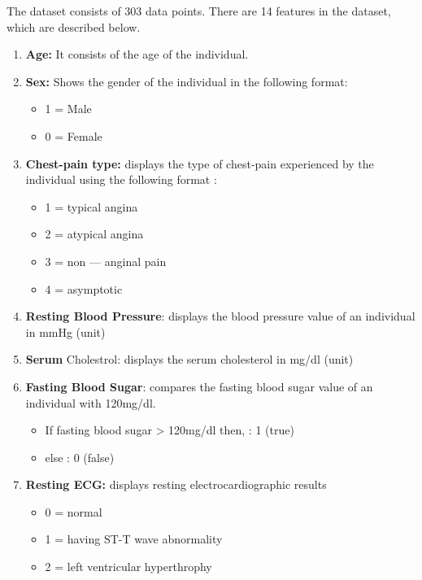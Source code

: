 \documentclass[oneside,12pt]{Classes/VTU}
\begin{document}
  The dataset consists of 303 data points. There are 14 features in the dataset, which are described below.
  \begin{enumerate}
  	\item\textbf{Age:} It consists of the age of the individual.
  	
  	\item \textbf{Sex:} Shows the gender of the individual in the following format:
  		\begin{itemize}
  			\item 1 = Male
  			\item 0 = Female
  		\end{itemize}
  	
  	\item \textbf{Chest-pain type:} displays the type of chest-pain experienced by the individual using the following format :
  		\begin{itemize}
  			\item 1 = typical angina
  			\item 2 = atypical angina
  			\item 3 = non — anginal pain
  			\item 4 = asymptotic
  		\end{itemize}
  
  	\item \textbf{Resting Blood Pressure}: displays the blood pressure value of an individual in mmHg (unit)
  	
  	\item \textbf{Serum} Cholestrol: displays the serum cholesterol in mg/dl (unit)
  	
  	\item \textbf{Fasting Blood Sugar}: compares the fasting blood sugar value of an individual with 120mg/dl.
  		\begin{itemize}
  			\item If fasting blood sugar > 120mg/dl then, : 1 (true)
  			\item else                                    : 0 (false)
  		\end{itemize}
  	
  	\item \textbf{Resting ECG:} displays resting electrocardiographic results
  	\begin{itemize}
  		\item 0 = normal
  		\item 1 = having ST-T wave abnormality
  		\item 2 = left ventricular hyperthrophy
  	\end{itemize}
  	

\end{enumerate}
\end{document}
